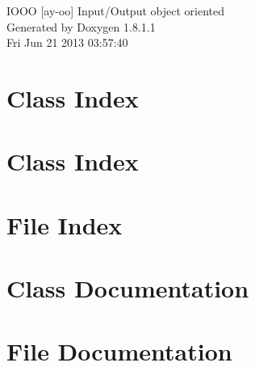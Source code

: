 \documentclass{book}
\begin{document}
\hypersetup{pageanchor=false,citecolor=blue}
\begin{titlepage}
\vspace*{7cm}
\begin{center}
{\Large I\-O\-O\-O \mbox{[}ay-\/oo\mbox{]} Input/\-Output object oriented }\\
\vspace*{1cm}
{\large Generated by Doxygen 1.8.1.1}\\
\vspace*{0.5cm}
{\small Fri Jun 21 2013 03:57:40}\\
\end{center}
\end{titlepage}
\clearemptydoublepage
{}
\tableofcontents
\clearemptydoublepage
{}
\hypersetup{pageanchor=true,citecolor=blue}
\chapter{Class Index}

\chapter{Class Index}

\chapter{File Index}

\chapter{Class Documentation}











\chapter{File Documentation}






















\printindex
\end{document}
